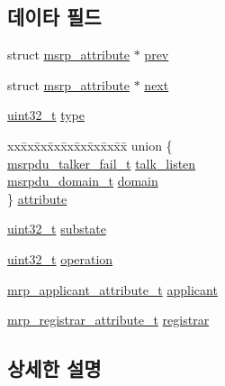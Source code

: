 \subsection*{데이타 필드}
\begin{DoxyCompactItemize}
\item 
struct \hyperlink{structmsrp__attribute}{msrp\+\_\+attribute} $\ast$ \hyperlink{structmsrp__attribute_a49481293ca3184e69bb9c85ed2888147}{prev}
\item 
struct \hyperlink{structmsrp__attribute}{msrp\+\_\+attribute} $\ast$ \hyperlink{structmsrp__attribute_aee93bf3c35daae5c99a5157c87f4b7cb}{next}
\item 
\hyperlink{parse_8c_a6eb1e68cc391dd753bc8ce896dbb8315}{uint32\+\_\+t} \hyperlink{structmsrp__attribute_ad44b615021ed3ccb734fcaf583ef4a03}{type}
\item 
\begin{tabbing}
xx\=xx\=xx\=xx\=xx\=xx\=xx\=xx\=xx\=\kill
union \{\\
\>\hyperlink{msrp_8h_a2f5046bacf84bca1dd60bb2f2659dc02}{msrpdu\_talker\_fail\_t} \hyperlink{structmsrp__attribute_a940e887e9c7477a40dba8b9964d18de2}{talk\_listen}\\
\>\hyperlink{msrp_8h_a4f6aa8c175086bc134f7ecb16bcddc12}{msrpdu\_domain\_t} \hyperlink{structmsrp__attribute_aa7d094869072ffd53218ef7d106eb7ae}{domain}\\
\} \hyperlink{structmsrp__attribute_a3ef689bda345890720a9e52cc01a46d3}{attribute}\\

\end{tabbing}\item 
\hyperlink{parse_8c_a6eb1e68cc391dd753bc8ce896dbb8315}{uint32\+\_\+t} \hyperlink{structmsrp__attribute_a77fc98efbb49dcae027e0dde935b7070}{substate}
\item 
\hyperlink{parse_8c_a6eb1e68cc391dd753bc8ce896dbb8315}{uint32\+\_\+t} \hyperlink{structmsrp__attribute_a2aadabc5648d67e2327e5503c3d3dce5}{operation}
\item 
\hyperlink{mrp_8h_a958c5bcf98d8118f9ba46d7b44862232}{mrp\+\_\+applicant\+\_\+attribute\+\_\+t} \hyperlink{structmsrp__attribute_a9ee7e01253c78c410bf44f18a6372d92}{applicant}
\item 
\hyperlink{mrp_8h_a74a88ecd39ca17a8765eb9cbf15b3da9}{mrp\+\_\+registrar\+\_\+attribute\+\_\+t} \hyperlink{structmsrp__attribute_a9e893db6ef01e9cda330159f5d3ee764}{registrar}
\end{DoxyCompactItemize}


\subsection{상세한 설명}


